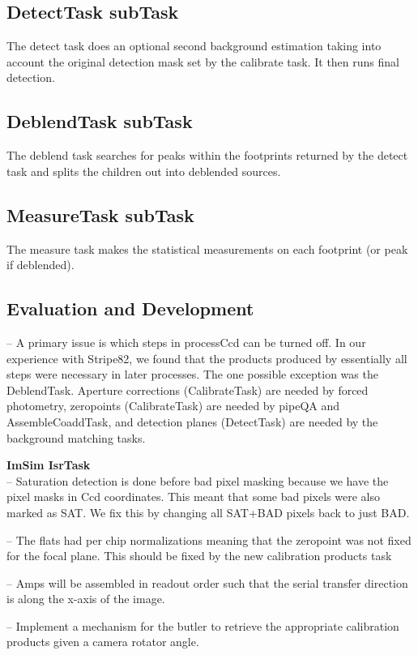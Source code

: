 \documentclass[12pt]{article}
\begin{document}
\subsection{DetectTask subTask}
The detect task does an optional second background estimation taking into account the original detection mask set by the calibrate task.
It then runs final detection.

\subsection{DeblendTask subTask}
The deblend task searches for peaks within the footprints returned by the detect task and splits the children out into deblended sources.

\subsection{MeasureTask subTask}
The measure task makes the statistical measurements on each footprint (or peak if deblended).

\subsection{Evaluation and Development}

-- A primary issue is which steps in processCcd can be turned off.  In our experience with Stripe82, we found that the products produced by
essentially all steps were necessary in later processes.  The one possible exception was the DeblendTask.  Aperture corrections (CalibrateTask) 
are needed by forced photometry, zeropoints (CalibrateTask)
are needed by pipeQA and AssembleCoaddTask, and detection planes (DetectTask) are needed by the background matching tasks.

{\bf ImSim IsrTask}\\
-- Saturation detection is done before bad pixel masking because we have the pixel masks in Ccd coordinates.
This meant that some bad pixels were also marked as SAT.  We fix this by changing all SAT+BAD pixels back to just BAD.

-- The flats had per chip normalizations meaning that the zeropoint was not fixed for the focal plane.  This should be
fixed by the new calibration products task

-- Amps will be assembled in readout order such that the serial transfer direction is along the x-axis of the image.

-- Implement a mechanism for the butler to retrieve the appropriate calibration products given a camera rotator angle.
\end{document}
